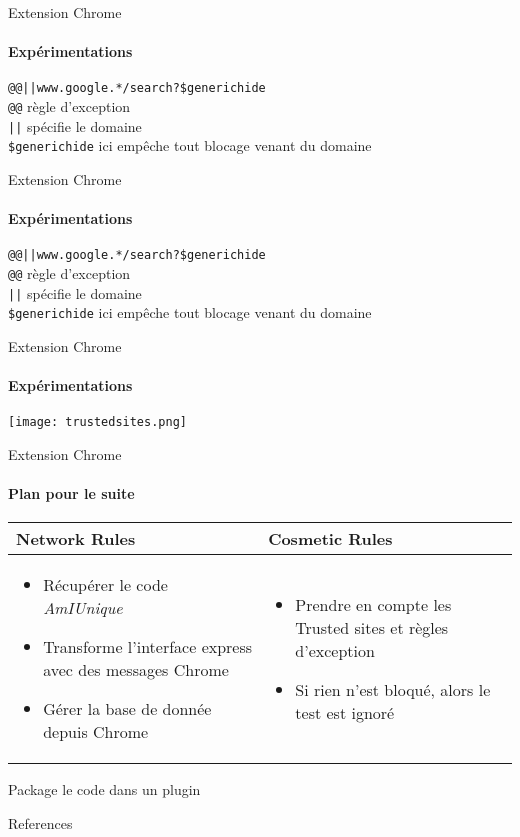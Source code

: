 \documentclass{beamer}
\begin{document}
	\begin{frame}[fragile]{Extension Chrome}
		\framesubtitle{Expérimentations}
		\centering
		
		\texttt{@@||www.google.*/search?\$generichide}\\
		\vspace{1em}\color{gray}
		\texttt{@@} \textrightarrow règle d'exception\\
		\vspace{1em}\color{black}
		\texttt{||} spécifie le domaine\\
		\vspace{1em}\color{lightgray}
		\texttt{\$generichide} ici empêche tout blocage venant du domaine 
	\end{frame}
	
	\begin{frame}[fragile]{Extension Chrome}
		\framesubtitle{Expérimentations}
		\centering
		
		\texttt{@@||www.google.*/search?\$generichide}\\
		\vspace{1em}\color{gray}
		\texttt{@@} \textrightarrow règle d'exception\\
		\vspace{1em}
		\texttt{||} spécifie le domaine\\
		\vspace{1em}\color{black}
		\texttt{\$generichide} ici empêche tout blocage venant du domaine 
	\end{frame}

	\begin{frame}[fragile]{Extension Chrome}
		\framesubtitle{Expérimentations}
		\centering
		
		\texttt{[image: trustedsites.png]}
	\end{frame}

	\begin{frame}[fragile]{Extension Chrome}
		\framesubtitle{Plan pour le suite}
		\centering
		\begin{tabular}{m{} m{}}
			Network Rules & Cosmetic Rules \\
			\hline
			\begin{itemize}
				\item Récupérer le code \textit{AmIUnique}
				\item Transforme l'interface express avec des messages Chrome
				\item Gérer la base de donnée depuis Chrome
			\end{itemize} & 
			\begin{itemize}
				\item Prendre en compte les Trusted sites et règles d'exception
				\item Si rien n'est bloqué, alors le test est ignoré
			\end{itemize}
		\end{tabular}
		\vspace{2em}
		Package le code dans un plugin
		
	\end{frame}

	\begin{frame}{References}
		\nocite{*}
		\printbibliography
	\end{frame}
\end{document}
